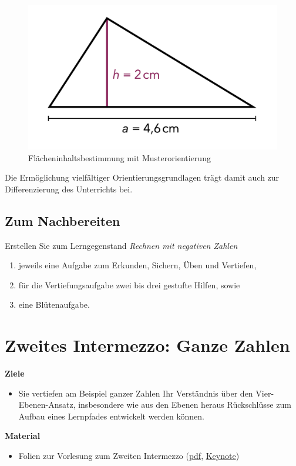 \documentclass[
]{scrbook}
\providecommand{\tightlist}{%
  \setlength{\itemsep}{0pt}\setlength{\parskip}{0pt}}
\renewenvironment{quote}{
  \list{}{
	\leftmargin0.2cm   %
    \rightmargin\leftmargin
      	\def\FrameCommand
    {%
        {\color{quoteColor}\vrule width 2pt}%
        \hspace{0pt}%
    }%
    \MakeFramed{\advance \hsize -\width \FrameRestore}    \color{quoteColor}
    }
  \item\relax
}
{\endlist\color{black}\endMakeFramed}
\theoremstyle{definition}
\theoremstyle{definition}
\theoremstyle{definition}
\theoremstyle{definition}
\theoremstyle{remark}
\begin{document}
\begin{figure}

{\centering \includegraphics[width=0.5\linewidth]{pictures/8-Aufgabenorientierung} 

}

\caption{Flächeninhaltsbestimmung mit Musterorientierung}\label{fig:Aufgabenorientierung}
\end{figure}

Die Ermöglichung vielfältiger Orientierungsgrundlagen trägt damit auch zur Differenzierung des Unterrichts bei.

\hypertarget{aufgaben-gestalten-nachbereitung}{%
\section{Zum Nachbereiten}\label{aufgaben-gestalten-nachbereitung}}

Erstellen Sie zum Lerngegenstand \emph{Rechnen mit negativen Zahlen}

\begin{enumerate}
\def\labelenumi{\alph{enumi})}
\item
  jeweils eine Aufgabe zum Erkunden, Sichern, Üben und Vertiefen,
\item
  für die Vertiefungsaufgabe zwei bis drei gestufte Hilfen, sowie
\item
  eine Blütenaufgabe.
\end{enumerate}

\hypertarget{zweites-intermezzo-ganze-zahlen}{%
\chapter{Zweites Intermezzo: Ganze Zahlen}\label{zweites-intermezzo-ganze-zahlen}}

\begin{quote}
\textbf{Ziele}

\begin{itemize}
\tightlist
\item
  Sie vertiefen am Beispiel ganzer Zahlen Ihr Verständnis über den Vier-Ebenen-Ansatz, insbesondere wie aus den Ebenen heraus Rückschlüsse zum Aufbau eines Lernpfades entwickelt werden können.
\end{itemize}

\textbf{Material}

\begin{itemize}
\tightlist
\item
  Folien zur Vorlesung zum Zweiten Intermezzo (\href{files/Stoffdidaktik-WiSe2223-Kap9.pdf}{pdf}, \href{files/Stoffdidaktik-WiSe2223-Kap9.key}{Keynote})
\end{itemize}
\end{quote}
\end{document}
